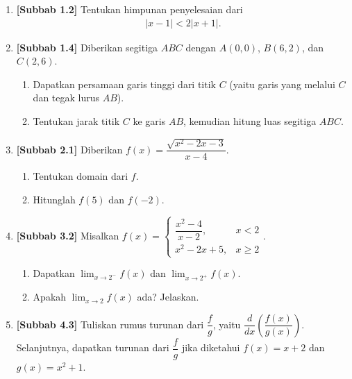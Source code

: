 \documentclass[10pt,openany,a4paper]{article}
\theoremstyle{definition}
\theoremstyle{definition}
\theoremstyle{plain}
\begin{document}
\newpage

\begin{enumerate}
    \item \textbf{[Subbab 1.2]} Tentukan himpunan penyelesaian dari
    \begin{align*}
        |x-1|<2|x+1|.
    \end{align*}

    \item \textbf{[Subbab 1.4]} Diberikan segitiga $ABC$ dengan $A(0,0)$, $B(6,2)$, dan $C(2,6)$.
    \begin{enumerate}
        \item Dapatkan persamaan garis tinggi dari titik $C$ (yaitu garis yang melalui $C$ dan tegak lurus $AB$).
        \item Tentukan jarak titik $C$ ke garis $AB$, kemudian hitung luas segitiga $ABC$.
    \end{enumerate}

    \item \textbf{[Subbab 2.1]} Diberikan $f(x)=\dfrac{\sqrt{x^2-2x-3}}{x-4}$.
    \begin{enumerate}
        \item Tentukan domain dari $f$.
        \item Hitunglah $f(5)$ dan $f(-2)$.
    \end{enumerate}

    \item \textbf{[Subbab 3.2]} Misalkan $f(x)=\begin{cases}
        \dfrac{x^2-4}{x-2}, & x<2\\
        x^2-2x+5, & x\geq 2
    \end{cases}$.
    \begin{enumerate}
        \item Dapatkan $\displaystyle\lim_{x\to 2^-}f(x)$ dan $\displaystyle\lim_{x\to 2^+}f(x)$.
        \item Apakah $\displaystyle\lim_{x\to 2}f(x)$ ada? Jelaskan.
    \end{enumerate}

    \item \textbf{[Subbab 4.3]} Tuliskan rumus turunan dari $\dfrac{f}{g}$, yaitu $\dfrac{d}{dx}\left(\dfrac{f(x)}{g(x)}\right)$.\\
    Selanjutnya, dapatkan turunan dari $\dfrac{f}{g}$ jika diketahui $f(x)=x+2$ dan $g(x)=x^2+1$.
\end{enumerate}
\end{document}
